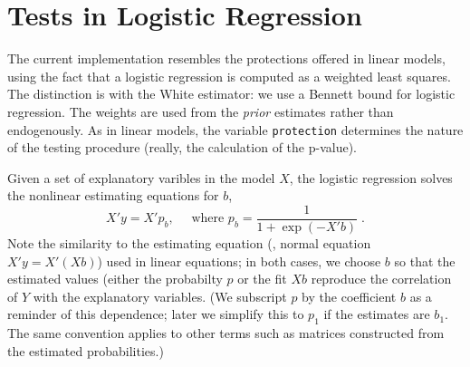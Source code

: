 \documentclass[12pt]{article}
\begin{document}
\section{Tests in Logistic Regression} %

 The current implementation resembles the protections offered in linear models,
 using the fact that a logistic regression is computed as a weighted least
 squares.  The distinction is with the White estimator: we use a Bennett bound
 for logistic regression.  The weights are used from the {\em prior} estimates
 rather than endogenously.  As in linear models, the variable {\tt protection}
 determines the nature of the testing procedure (really, the calculation of the
 p-value).  

 Given a set of explanatory varibles in the model $X$, the logistic regression
 solves the nonlinear estimating equations for $b$,
\begin{equation}
  X'y = X'p_b, \quad \mbox{ where } p_b = \frac{1}{1+\exp(-X'b)} \;.
\label{eq:esteq}
\end{equation}
 Note the similarity to the estimating equation (\aka, normal equation $X'y =
 X'(Xb)$) used in linear equations; in both cases, we choose $b$ so that the
 estimated values (either the probabilty $p$ or the fit $Xb$ reproduce the
 correlation of $Y$ with the explanatory variables.  (We subscript $p$ by the
 coefficient $b$ as a reminder of this dependence; later we simplify this to
 $p_1$ if the estimates are $b_1$. The same convention applies to other terms
 such as matrices constructed from the estimated probabilities.)
\end{document}

